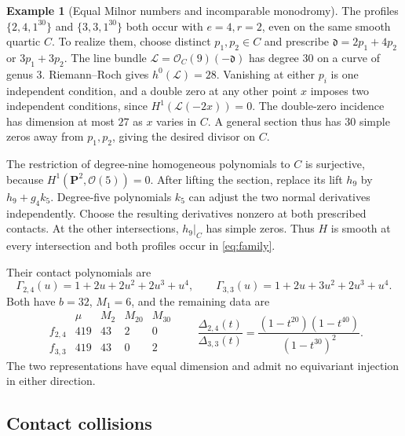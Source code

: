 \documentclass[11pt]{article}
\numberwithin{equation}{section}
\theoremstyle{definition}
\newtheorem{example}[theorem]{Example}
\theoremstyle{remark}
\newcommand{\PP}{\mathbf P}
\begin{document}
\begin{example}[Equal Milnor numbers and incomparable monodromy]
\label{ex:equal-mu}
The profiles $\{2,4,1^{30}\}$ and $\{3,3,1^{30}\}$ both occur
with $e=4,r=2$, even on the same smooth quartic $C$.
To realize them, choose distinct $p_1,p_2\in C$ and prescribe
$\mathfrak d=2p_1+4p_2$ or $3p_1+3p_2$.
The line bundle
$\mathcal L=\mathcal O_C(9)(-\mathfrak d)$ has degree $30$
on a curve of genus $3$. Riemann--Roch gives
$h^0(\mathcal L)=28$. Vanishing at either $p_i$ is one
independent condition, and a double zero at any other point
$x$ imposes two independent conditions, since
$H^1(\mathcal L(-2x))=0$.
The double-zero incidence has dimension at most $27$ as
$x$ varies in $C$. A general section thus has $30$ simple
zeros away from $p_1,p_2$, giving the desired divisor on $C$.

The restriction of degree-nine homogeneous polynomials to
$C$ is surjective, because $H^1(\PP^2,\mathcal O(5))=0$.
After lifting the section, replace its lift $h_9$ by
$h_9+g_4k_5$. Degree-five polynomials $k_5$ can adjust the
two normal derivatives independently. Choose the resulting
derivatives nonzero at both prescribed contacts. At the other
intersections, $h_9|_C$ has simple zeros. Thus $H$ is smooth
at every intersection and both profiles occur in
\eqref{eq:family}.

Their contact polynomials are
\[
 \Gamma_{2,4}(u)=1+2u+2u^2+2u^3+u^4,\qquad
 \Gamma_{3,3}(u)=1+2u+3u^2+2u^3+u^4.
\]
Both have $b=32$, $M_1=6$, and the remaining data are
\[
 \begin{array}{c|rrrr}
       &\mu&M_2&M_{20}&M_{30}\\ \hline
 f_{2,4}&419&43&2&0\\
 f_{3,3}&419&43&0&2
 \end{array}
 \qquad
 \frac{\Delta_{2,4}(t)}{\Delta_{3,3}(t)}
       =\frac{(1-t^{20})(1-t^{40})}{(1-t^{30})^2}.
\]
The two representations have equal dimension and admit no
equivariant injection in either direction.
\end{example}

\subsection{Contact collisions}
\end{document}
